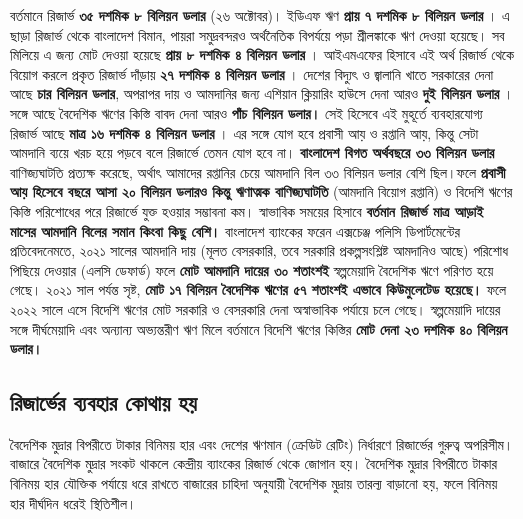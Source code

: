 \documentclass[11pt]{article}
\begin{document}
বর্তমানে রিজার্ভ \textbf{৩৫ দশমিক ৮ বিলিয়ন ডলার} (২৬ অক্টোবর)। ইডিএফ ঋণ \textbf{প্রায় ৭
দশমিক ৮ বিলিয়ন ডলার} । এ ছাড়া রিজার্ভ থেকে বাংলাদেশ বিমান, পায়রা
সমুদ্রবন্দরও অর্থনৈতিক বিপর্যয়ে পড়া শ্রীলঙ্কাকে ঋণ দেওয়া হয়েছে। সব মিলিয়ে এ
জন্য মোট দেওয়া হয়েছে \textbf{প্রায় ৮ দশমিক ৪ বিলিয়ন ডলার} । আইএমএফের হিসাবে এই
অর্থ রিজার্ভ থেকে বিয়োগ করলে প্রকৃত রিজার্ভ দাঁড়ায় \textbf{২৭ দশমিক ৪ বিলিয়ন ডলার} ।
দেশের বিদ্যুৎ ও জ্বালানি খাতে সরকারের দেনা আছে \textbf{চার বিলিয়ন ডলার}, অপরাপর
দায় ও আমদানির জন্য এশিয়ান ক্লিয়ারিং হাউসে দেনা আরও \textbf{দুই বিলিয়ন ডলার} । সঙ্গে
আছে বৈদেশিক ঋণের কিস্তি বাবদ দেনা আরও \textbf{পাঁচ বিলিয়ন ডলার।}  সেই হিসেবে এই
মুহূর্তে ব্যবহারযোগ্য রিজার্ভ আছে \textbf{মাত্র ১৬ দশমিক ৪ বিলিয়ন ডলার} । এর সঙ্গে যোগ
হবে প্রবাসী আয় ও রপ্তানি আয়, কিন্তু সেটা আমদানি ব্যয়ে খরচ হয়ে পড়বে বলে
রিজার্ভে তেমন যোগ হবে না। \textbf{বাংলাদেশ বিগত অর্থবছরে ৩৩ বিলিয়ন ডলার}
বাণিজ্যঘাটতি প্রত্যক্ষ করেছে, অর্থাৎ আমাদের রপ্তানির চেয়ে আমদানি বিল ৩৩
বিলিয়ন ডলার বেশি ছিল।ফলে \textbf{প্রবাসী আয় হিসেবে বছরে আসা ২০ বিলিয়ন ডলারও
কিন্তু ঋণাত্মক বাণিজ্যঘাটতি} (আমদানি বিয়োগ রপ্তানি) ও বিদেশি ঋণের কিস্তি
পরিশোধের পরে রিজার্ভে যুক্ত হওয়ার সম্ভাবনা কম। স্বাভাবিক সময়ের হিসাবে
\textbf{বর্তমান রিজার্ভ মাত্র আড়াই মাসের আমদানি বিলের সমান কিংবা কিছু
বেশি।} বাংলাদেশ ব্যাংকের ফরেন এক্সচেঞ্জ পলিসি ডিপার্টমেন্টের প্রতিবেদনেমতে,
২০২১ সালের আমদানি দায় (মূলত বেসরকারি, তবে সরকারি প্রকল্পসংশ্লিষ্ট আমদানিও
আছে) পরিশোধ পিছিয়ে দেওয়ার (এলসি ডেফার্ড) ফলে \textbf{মোট আমদানি দায়ের ৩০ শতাংশই}
স্বল্পমেয়াদি বৈদেশিক ঋণে পরিণত হয়ে গেছে। ২০২১ সাল পর্যন্ত সৃষ্ট, \textbf{মোট ১৭
বিলিয়ন বৈদেশিক ঋণের ৫৭ শতাংশই এভাবে কিউমুলেটেড হয়েছে।} ফলে ২০২২ সালে এসে
বিদেশি ঋণের মোট সরকারি ও বেসরকারি দেনা অস্বাভাবিক পর্যায়ে চলে গেছে।
স্বল্পমেয়াদি দায়ের সঙ্গে দীর্ঘমেয়াদি এবং অন্যান্য অভ্যন্তরীণ ঋণ মিলে বর্তমানে
বিদেশি ঋণের কিস্তির \textbf{মোট দেনা ২৩ দশমিক ৪০ বিলিয়ন ডলার।}

\subsection{রিজার্ভের ব্যবহার কোথায় হয়}
\label{sec:org0a3d6c0}
বৈদেশিক মুদ্রার বিপরীতে টাকার বিনিময় হার এবং দেশের ঋণমান (ক্রেডিট রেটিং)
নির্ধারণে রিজার্ভের গুরুত্ব অপরিসীম। বাজারে বৈদেশিক মুদ্রার সংকট থাকলে
কেন্দ্রীয় ব্যাংকের রিজার্ভ থেকে জোগান হয়। বৈদেশিক মুদ্রার বিপরীতে টাকার
বিনিময় হার যৌক্তিক পর্যায়ে ধরে রাখতে বাজারের চাহিদা অনুযায়ী বৈদেশিক মুদ্রায়
তারল্য বাড়ানো হয়, ফলে বিনিময় হার দীর্ঘদিন ধরেই স্থিতিশীল।
\end{document}
